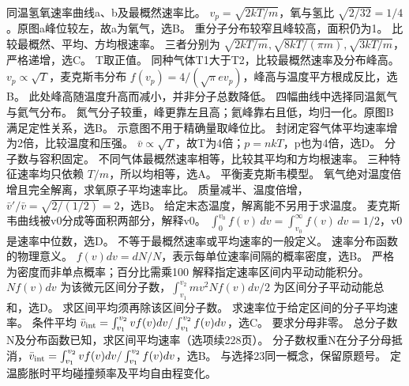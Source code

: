 \problemtext 同温氢氧速率曲线a、b及最概然速率比。
\workings $v_p=\sqrt{2kT/m}$，氧与氢比 $\sqrt{2/32}=1/4$。原图a峰位较左，故a为氧气，选B。
\crosscheck 重分子分布较窄且峰较高，面积仍为1。
\problemtext 比较最概然、平均、方均根速率。
\workings 三者分别为 $\sqrt{2kT/m},\sqrt{8kT/(\pi m)},\sqrt{3kT/m}$，严格递增，选C。
\crosscheck T取正值。
\problemtext 同种气体T1大于T2，比较最概然速率及分布峰高。
\workings $v_p\propto\sqrt T$，麦克斯韦分布 $f(v_p)=4/(\sqrt\pi e v_p)$，峰高与温度平方根成反比，选B。
\crosscheck 此处峰高随温度升高而减小，并非分子总数降低。
\problemtext 四幅曲线中选择同温氮气与氦气分布。
\workings 氮气分子较重，峰更靠左且高；氦峰靠右且低，均归一化。原图B满足定性关系，选B。
\crosscheck 示意图不用于精确量取峰位比。
\problemtext 封闭定容气体平均速率增为2倍，比较温度和压强。
\workings $\bar v\propto\sqrt T$，故T为4倍；$p=nkT$，p也为4倍，选D。
\crosscheck 分子数与容积固定。
\problemtext 不同气体最概然速率相等，比较其平均和方均根速率。
\workings 三种特征速率均只依赖 $T/m$，所以均相等，选A。
\crosscheck 平衡麦克斯韦模型。
\problemtext 氧气绝对温度倍增且完全解离，求氧原子平均速率比。
\workings 质量减半、温度倍增，$\bar v'/\bar v=\sqrt{2/(1/2)}=2$，选B。
\crosscheck 给定末态温度，解离能不另用于求温度。
\problemtext 麦克斯韦曲线被v0分成等面积两部分，解释v0。
\workings $\int_0^{v_0} f(v)\,dv=\int_{v_0}^{\infty}f(v)\,dv=1/2$，v0是速率中位数，选D。
\crosscheck 不等于最概然速率或平均速率的一般定义。
\problemtext 速率分布函数的物理意义。
\workings $f(v)dv=dN/N$，表示每单位速率间隔的概率密度，选B。
\crosscheck 严格为密度而非单点概率；百分比需乘100%
\problemtext 解释指定速率区间内平动动能积分。
\workings $Nf(v)dv$ 为该微元区间分子数，$\int_{v_1}^{v_2}mv^2Nf(v)dv/2$ 为区间分子平动动能总和，选D。
\crosscheck 求区间平均须再除该区间分子数。
\problemtext 求速率位于给定区间的分子平均速率。
\workings 条件平均 $\bar v_{\rm int}=\int_{v_1}^{v_2}vf(v)dv/\int_{v_1}^{v_2}f(v)dv$，选C。
\crosscheck 要求分母非零。
\problemtext 总分子数N及分布函数已知，求区间平均速率（选项续228页）。
\workings 分子数权重N在分子分母抵消，$\bar v_{\rm int}=\int_{v_1}^{v_2}vf(v)dv/\int_{v_1}^{v_2}f(v)dv$，选B。
\crosscheck 与选择23同一概念，保留原题号。
\problemtext 定温膨胀时平均碰撞频率及平均自由程变化。
